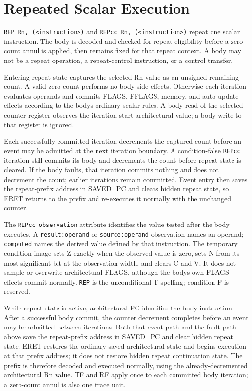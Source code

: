 \clearpage
\section{Repeated Scalar Execution}\label{page:repeated-scalar-execution}

\texttt{REP Rn, (<instruction>)} and \texttt{REPcc Rn, (<instruction>)} repeat one scalar instruction. The body is
decoded and checked for repeat eligibility before a zero-count annul is applied, then remains fixed for that repeat
context. A body may not be a repeat operation, a repeat-control instruction, or a control transfer.

Entering repeat state captures the selected Rn value as an unsigned remaining count. A valid zero count performs no
body side effects. Otherwise each iteration evaluates operands and commits FLAGS, FFLAGS, memory, and auto-update
effects according to the body\textquotesingle{}s ordinary scalar rules. A body read of the selected counter register observes the
iteration-start architectural value; a body write to that register is ignored.

Each successfully committed iteration decrements the captured count before an event may be admitted at the next
iteration boundary. A condition-false \texttt{REPcc} iteration still commits its body and decrements the count before
repeat state is cleared. If the body faults, that iteration commits nothing and does not decrement the count; earlier
iterations remain committed. Event entry then saves the repeat-prefix address in SAVED\_PC and clears hidden repeat
state, so ERET returns to the prefix and re-executes it normally with the unchanged counter.

The \texttt{REPcc observation} attribute identifies the value tested after the body executes. A
\texttt{result:operand} or \texttt{source:operand} observation names an operand; \texttt{computed} names the derived
value defined by that instruction. The temporary condition image sets Z exactly when the observed value is zero,
sets N from its most significant bit at the observation width, and clears C and V. It does not sample or overwrite
architectural FLAGS, although the body\textquotesingle{}s own FLAGS effects commit normally. \texttt{REP} is the unconditional T
spelling; condition F is reserved.

While repeat state is active, architectural PC identifies the body instruction. After a successful body commit, the
counter decrement completes before an event may be admitted between iterations. Both that event path and the
fault path above save the repeat-prefix address in SAVED\_PC and clear hidden repeat state. ERET restores the
ordinary saved architectural state and begins execution at that prefix address; it does not restore hidden
repeat continuation state. The prefix is therefore decoded and executed normally, using the already-decremented
architectural Rn value. TF and RF apply once to each committed body iteration; a zero-count annul is also one trace
unit.
